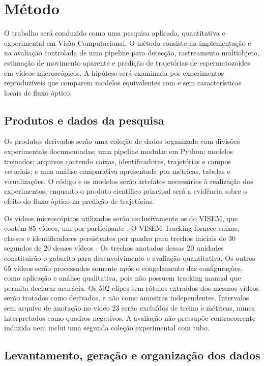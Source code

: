 \chapter[Método]{Método}
\label{cap:metodo}

O trabalho será conduzido como uma pesquisa aplicada, quantitativa e experimental em Visão Computacional. O método consiste na implementação e na avaliação controlada de uma pipeline para detecção, rastreamento multiobjeto, estimação de movimento aparente e predição de trajetórias de espermatozoides em vídeos microscópicos. A hipótese será examinada por experimentos reproduzíveis que comparem modelos equivalentes com e sem características locais de fluxo óptico.

\section{Produtos e dados da pesquisa}

Os produtos derivados serão uma coleção de dados organizada com divisões experimentais documentadas; uma pipeline modular em Python; modelos treinados; arquivos contendo caixas, identificadores, trajetórias e campos vetoriais; e uma análise comparativa apresentada por métricas, tabelas e visualizações. O código e os modelos serão artefatos necessários à realização dos experimentos, enquanto o produto científico principal será a evidência sobre o efeito do fluxo óptico na predição de trajetórias.

Os vídeos microscópicos utilizados serão exclusivamente os do VISEM, que contém 85 vídeos, um por participante \cite{haugen2019visem}. O VISEM-Tracking fornece caixas, classes e identificadores persistentes por quadro para trechos iniciais de 30 segundos de 20 desses vídeos \cite{thambawita2023visemtracking}. Os trechos anotados dessas 20 unidades constituirão o gabarito para desenvolvimento e avaliação quantitativa. Os outros 65 vídeos serão processados somente após o congelamento das configurações, como aplicação e análise qualitativa, pois não possuem tracking manual que permita declarar acurácia. Os 502 clipes sem rótulos extraídos dos mesmos vídeos serão tratados como derivados, e não como amostras independentes. Intervalos sem arquivo de anotação no vídeo 23 serão excluídos de treino e métricas, nunca interpretados como quadros negativos. A avaliação não pressupõe contracorrente induzida nem inclui uma segunda coleção experimental com tubo.

\section{Levantamento, geração e organização dos dados}

